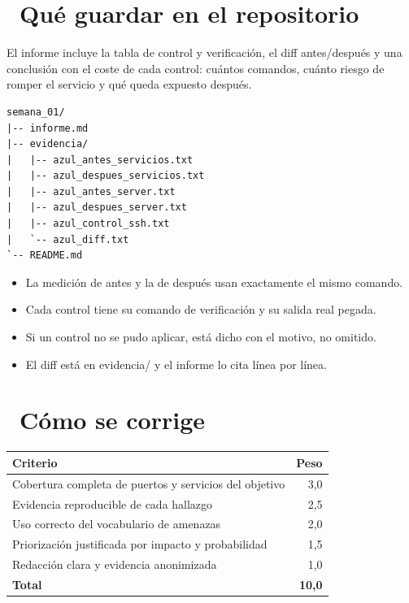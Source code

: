 \documentclass[11pt,a4paper]{article}
\newcommand{\iconotexto}[2]{\textcolor{cyanNeon}{\faIcon{#1}}~#2}
\begin{document}
\section{\iconotexto{box-open}{Qué guardar en el repositorio}}

El informe incluye la tabla de control y verificación, el diff antes/después y una conclusión con el coste de cada control: cuántos comandos, cuánto riesgo de romper el servicio y qué queda expuesto después.

\begin{lstlisting}[style=estiloCodigo]
semana_01/
|-- informe.md
|-- evidencia/
|   |-- azul_antes_servicios.txt
|   |-- azul_despues_servicios.txt
|   |-- azul_antes_server.txt
|   |-- azul_despues_server.txt
|   |-- azul_control_ssh.txt
|   `-- azul_diff.txt
`-- README.md
\end{lstlisting}

\begin{itemize}[leftmargin=1.4em,itemsep=2pt,topsep=3pt]
  \item La medición de antes y la de después usan exactamente el mismo comando.
  \item Cada control tiene su comando de verificación y su salida real pegada.
  \item Si un control no se pudo aplicar, está dicho con el motivo, no omitido.
  \item El diff está en evidencia/ y el informe lo cita línea por línea.
\end{itemize}

\section{\iconotexto{ruler-combined}{Cómo se corrige}}

\begin{tabularx}{\linewidth}{@{}X r@{}}
\toprule
Criterio & Peso\\
\midrule
Cobertura completa de puertos y servicios del objetivo & 3,0 \\
Evidencia reproducible de cada hallazgo & 2,5 \\
Uso correcto del vocabulario de amenazas & 2,0 \\
Priorización justificada por impacto y probabilidad & 1,5 \\
Redacción clara y evidencia anonimizada & 1,0 \\
\midrule
\textbf{Total} & \textbf{10,0}\\
\bottomrule
\end{tabularx}
\end{document}
